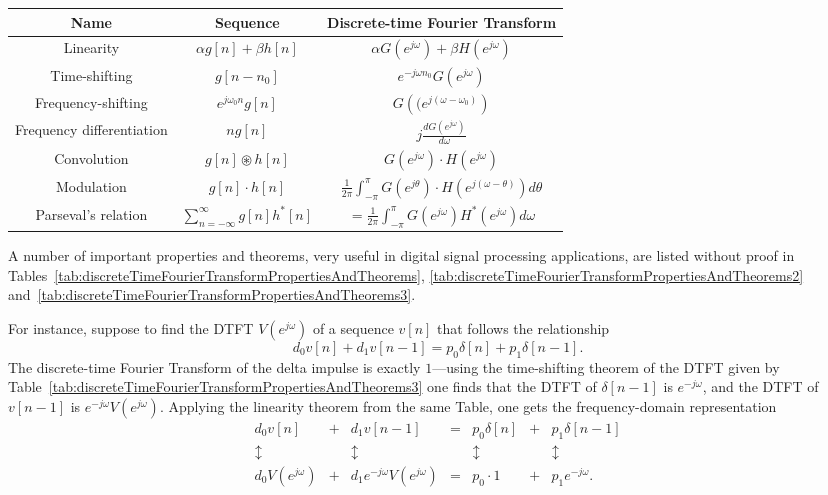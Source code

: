 \documentclass[\documentfontsize, twocolumn]{\classname}
\begin{document}
\begin{table*}[ht]
\centering
\begin{tabular}{ccc}
    \hline
    \textbf{Name} & \textbf{Sequence} & \textbf{Discrete-time Fourier Transform} \\
    \hline
    Linearity & $\alpha g[n] + \beta h[n]$ & $\alpha G(e^{j\omega}) + \beta H(e^{j\omega})$\\
    Time-shifting & $g[n-n_0]$ & $e^{-j\omega n_0} G(e^{j\omega})$ \\
    Frequency-shifting & $e^{j\omega_0 n}g[n]$ & $G\left((e^{j(\omega - \omega_0)}\right)$ \\
    Frequency differentiation & $ng[n]$ & $j\frac {dG(e^{j\omega})}{d\omega}$ \\
    Convolution & $g[n] \circledast h[n]$ &$ G(e^{j\omega}) \cdot H(e^{j\omega})$\\
    Modulation & $g[n] \cdot h[n]$ &$ \frac{1}{2\pi} \int_{-\pi}^\pi G(e^{j\theta}) \cdot H(e^{j(\omega - \theta)}) d\theta$\\
    \hline
    Parseval's relation & $\sum_{n=-\infty}^\infty g[n]h^*[n]$ &$= \frac 1 {2\pi} \int_{-\pi}^\pi G(e^{j\omega})H^*(e^{j\omega})d\omega$\\
    \hline
\end{tabular}
\caption{Notable discrete-time Fourier Transform properties.}\label{tab:discreteTimeFourierTransformPropertiesAndTheorems3}
\end{table*}

A number of important properties and theorems, very useful in digital signal processing applications, are listed without proof in Tables~\ref{tab:discreteTimeFourierTransformPropertiesAndTheorems}, \ref{tab:discreteTimeFourierTransformPropertiesAndTheorems2} and~\ref{tab:discreteTimeFourierTransformPropertiesAndTheorems3}.


For instance, suppose to find the DTFT $V(e^{j\omega})$ of a sequence $v[n]$ that follows the relationship
\[d_0 v[n] + d_1v[n-1] = p_0 \delta[n] + p_1\delta[n-1].\]
The discrete-time Fourier Transform of the delta impulse is exactly $1$---using the time-shifting theorem of the DTFT given by Table~\ref{tab:discreteTimeFourierTransformPropertiesAndTheorems3} one finds that the DTFT of $\delta[n-1]$ is $e^{-j\omega}$, and the DTFT of $v[n-1]$ is $e^{-j\omega}V(e^{j\omega})$. Applying the linearity theorem from the same Table, one gets the frequency-domain representation
\[
\begin{array}{ccccccc}
    d_0v[n] &+& d_1v[n-1] &=& p_0\delta[n] &+& p_1\delta[n-1]\\
    \updownarrow & & \updownarrow & & \updownarrow & & \updownarrow \\
    d_0V(e^{j\omega}) &+& d_1e^{-j\omega}V(e^{j\omega}) &=& p_0\cdot 1 &+& p_1e^{-j\omega}.
\end{array}
\]
\end{document}
